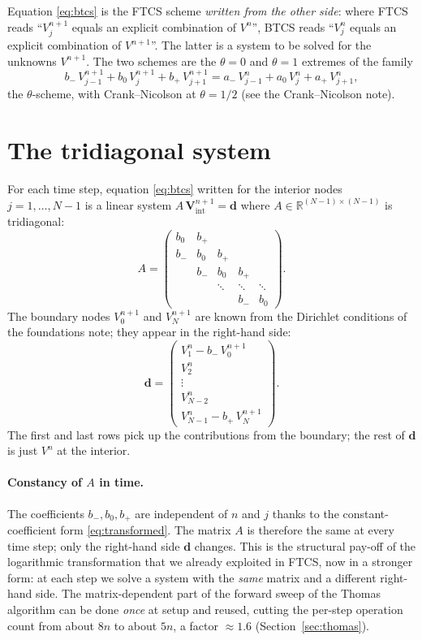 \documentclass[11pt,a4paper]{article}
\begin{document}
Equation \eqref{eq:btcs} is the FTCS scheme \emph{written from the
other side}: where FTCS reads ``$V_j^{n+1}$ equals an explicit
combination of $V^n$'', BTCS reads ``$V_j^n$ equals an explicit
combination of $V^{n+1}$''. The latter is a system to be solved for
the unknowns $V^{n+1}$. The two schemes are the $\theta = 0$ and
$\theta = 1$ extremes of the family
\[
b_-\,V_{j-1}^{n+1} + b_0\,V_j^{n+1} + b_+\,V_{j+1}^{n+1}
= a_-\,V_{j-1}^n + a_0\,V_j^n + a_+\,V_{j+1}^n,
\]
the $\theta$-scheme, with Crank--Nicolson at $\theta = 1/2$ (see
the Crank--Nicolson note).

\section{The tridiagonal system}

For each time step, equation \eqref{eq:btcs} written for the interior
nodes $j = 1, \dots, N-1$ is a linear system $A\,\mathbf{V}^{n+1}_{\mathrm{int}} = \mathbf{d}$
where $A \in \mathbb{R}^{(N-1)\times(N-1)}$ is tridiagonal:
\[
A = \begin{pmatrix}
b_0 & b_+ &        &        & \\
b_- & b_0 & b_+    &        & \\
    & b_- & b_0    & b_+    & \\
    &     & \ddots & \ddots & \ddots \\
    &     &        & b_-    & b_0
\end{pmatrix}.
\]
The boundary nodes $V_0^{n+1}$ and $V_N^{n+1}$ are known from the
Dirichlet conditions of the foundations note; they appear in the right-hand side:
\begin{equation}
\mathbf{d} = \begin{pmatrix}
V_1^n - b_-\,V_0^{n+1} \\
V_2^n \\
\vdots \\
V_{N-2}^n \\
V_{N-1}^n - b_+\,V_N^{n+1}
\end{pmatrix}.
\label{eq:rhs}
\end{equation}
The first and last rows pick up the contributions from the
boundary; the rest of $\mathbf{d}$ is just $V^n$ at the interior.

\paragraph{Constancy of $A$ in time.} The coefficients $b_-, b_0, b_+$
are independent of $n$ and $j$ thanks to the constant-coefficient
form \eqref{eq:transformed}. The matrix $A$ is therefore the same at
every time step; only the right-hand side $\mathbf{d}$ changes.
This is the structural pay-off of the logarithmic transformation
that we already exploited in FTCS, now in a stronger form: at
each step we solve a system with the \emph{same} matrix and a
different right-hand side. The matrix-dependent part of the forward
sweep of the Thomas algorithm can be done \emph{once} at setup and
reused, cutting the per-step operation count from about $8n$ to about
$5n$, a factor $\approx 1.6$ (Section~\ref{sec:thomas}).
\end{document}
